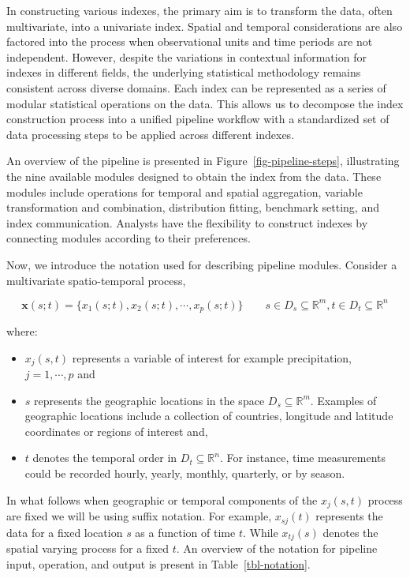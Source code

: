\documentclass[
]{interact}
\begin{document}
In constructing various indexes, the primary aim is to transform the
data, often multivariate, into a univariate index. Spatial and temporal
considerations are also factored into the process when observational
units and time periods are not independent. However, despite the
variations in contextual information for indexes in different fields,
the underlying statistical methodology remains consistent across diverse
domains. Each index can be represented as a series of modular
statistical operations on the data. This allows us to decompose the
index construction process into a unified pipeline workflow with a
standardized set of data processing steps to be applied across different
indexes.

An overview of the pipeline is presented in
Figure~\ref{fig-pipeline-steps}, illustrating the nine available modules
designed to obtain the index from the data. These modules include
operations for temporal and spatial aggregation, variable transformation
and combination, distribution fitting, benchmark setting, and index
communication. Analysts have the flexibility to construct indexes by
connecting modules according to their preferences.

Now, we introduce the notation used for describing pipeline modules.
Consider a multivariate spatio-temporal process,

\begin{equation}
\mathbf{x}(s;t) = \{x_1(s;t), x_2(s;t), \cdots, x_p(s;t)\} \qquad s \in D_s \subseteq \mathbb{R}^m, t \in D_t \subseteq \mathbb{R}^n 
\end{equation}

where:

\begin{itemize}
\item
  \(x_j(s, t)\) represents a variable of interest for example
  precipitation, \(j = 1, \cdots, p\) and
\item
  \(s\) represents the geographic locations in the space
  \(D_s \subseteq \mathbb{R}^m\). Examples of geographic locations
  include a collection of countries, longitude and latitude coordinates
  or regions of interest and,
\item
  \(t\) denotes the temporal order in \(D_t \subseteq \mathbb{R}^n\).
  For instance, time measurements could be recorded hourly, yearly,
  monthly, quarterly, or by season.
\end{itemize}

In what follows when geographic or temporal components of the
\(x_j(s,t)\) process are fixed we will be using suffix notation. For
example, \(x_{sj}(t)\) represents the data for a fixed location \(s\) as
a function of time \(t\). While \(x_{tj}(s)\) denotes the spatial
varying process for a fixed \(t\). An overview of the notation for
pipeline input, operation, and output is present in
Table~\ref{tbl-notation}.
\end{document}
